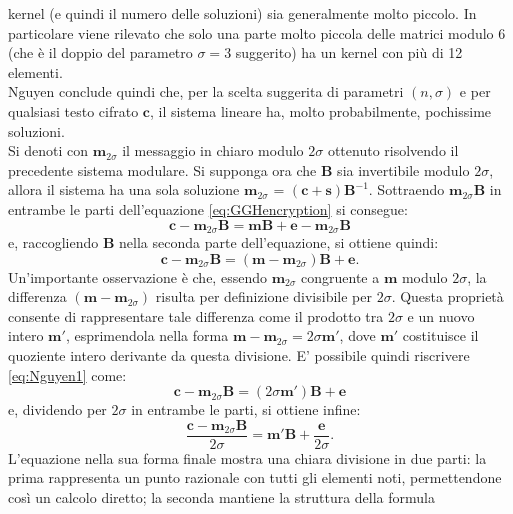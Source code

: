 kernel (e quindi il numero delle soluzioni) sia generalmente molto piccolo. In particolare
viene rilevato che solo una parte molto piccola delle matrici modulo 6 (che è il doppio del 
parametro $\sigma = 3$ suggerito) ha un kernel con più di 12 elementi. \\
Nguyen conclude quindi che, per la scelta suggerita di parametri $(n, \sigma)$ e per qualsiasi 
testo cifrato $\mathbf{c}$, il sistema lineare ha, molto probabilmente, pochissime soluzioni. \\
Si denoti con $\mathbf{m}_{2\sigma}$ il messaggio in chiaro modulo $2\sigma$ ottenuto 
risolvendo il precedente sistema modulare. Si supponga ora che $\mathbf{B}$ sia invertibile
modulo $2\sigma$, allora il sistema ha una sola soluzione 
$\mathbf{m}_{2\sigma}$ = $(\mathbf{c} + \mathbf{s})\mathbf{B}^{-1}$. Sottraendo $\mathbf{m}_{2\sigma}\mathbf{B}$ 
in entrambe le parti dell'equazione \ref{eq:GGHencryption} si consegue:
\[
    \mathbf{c} - \mathbf{m}_{2\sigma}\mathbf{B} = \mathbf{m}\mathbf{B} + \mathbf{e} - \mathbf{m}_{2\sigma}\mathbf{B}
\]
e, raccogliendo $\mathbf{B}$ nella seconda parte dell'equazione, si ottiene quindi:
\begin{equation}
    \label{eq:Nguyen1}
    \mathbf{c} - \mathbf{m}_{2\sigma}\mathbf{B} = (\mathbf{m} - \mathbf{m}_{2\sigma})\mathbf{B} + \mathbf{e}.
\end{equation}
Un'importante osservazione è che, essendo $\mathbf{m}_{2\sigma}$ congruente a $\mathbf{m}$ 
modulo $2\sigma$, la differenza $(\mathbf{m} - \mathbf{m}_{2\sigma})$ risulta per definizione 
divisibile per $2\sigma$. Questa proprietà consente di rappresentare tale differenza 
come il prodotto tra $2\sigma$ e un nuovo intero $\mathbf{m}'$, esprimendola nella 
forma $\mathbf{m} - \mathbf{m}_{2\sigma} = 2\sigma\mathbf{m}'$, dove $\mathbf{m}'$ 
costituisce il quoziente intero derivante da questa divisione. E' possibile quindi riscrivere
\ref{eq:Nguyen1} come:
\[
    \mathbf{c} - \mathbf{m}_{2\sigma}\mathbf{B} = (2\sigma\mathbf{m}')\mathbf{B} + \mathbf{e}
\]
e, dividendo per $2\sigma$ in entrambe le parti, si ottiene infine:
\begin{equation}
    \label{eq:Nguyen2}
    \frac{\mathbf{c} - \mathbf{m}_{2\sigma}\mathbf{B}}{2\sigma} = \mathbf{m}'\mathbf{B} + \frac{\mathbf{e}}{2\sigma}. 
\end{equation}
L'equazione  nella sua forma finale mostra una chiara divisione in due 
parti: la prima rappresenta un punto razionale con tutti gli elementi noti, 
permettendone così un calcolo diretto; la seconda mantiene la struttura della formula 

